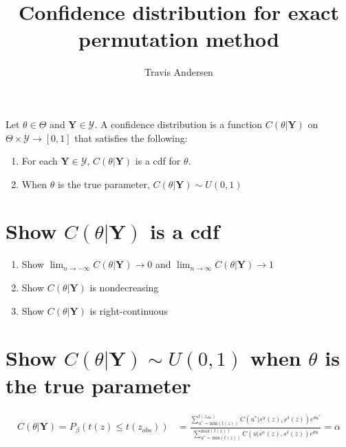 \documentclass{article}
\title{Confidence distribution for exact permutation method}
\author{Travis Andersen}
\begin{document}
\maketitle  

Let $\theta \in \Theta$ and $\textbf{Y} \in \mathcal{Y}$. A confidence distribution is a function $C(\theta|\textbf{Y})$ on $\Theta \times \mathcal{Y} \to [0, 1]$ that satisfies the following:

\begin{enumerate}
  \item For each $\textbf{Y} \in \mathcal{Y}$, $C(\theta|\textbf{Y})$ is a cdf for $\theta$. 
  \item When $\theta$ is the true parameter, $C(\theta|\textbf{Y}) \sim U(0, 1)$
\end{enumerate}

\section{Show $C(\theta|\textbf{Y})$ is a cdf}
\begin{enumerate}
  \item Show $\lim_{n \to -\infty} C(\theta|\textbf{Y}) \to 0$ and $\lim_{n \to \infty} C(\theta|\textbf{Y}) \to 1$
  \item Show $C(\theta|\textbf{Y})$ is nondecreasing
  \item Show $C(\theta|\textbf{Y})$ is right-continuous
\end{enumerate}

\section{Show $C(\theta|\textbf{Y}) \sim U(0, 1)$ when $\theta$ is the true parameter}

\begin{align*}
  C(\theta|\textbf{Y}) = P_\beta(t(z) \leq t(z_{obs})) &= \frac{\sum_{u^*=\text{min}(t(z))}^{t(z_{obs})} C(u^*|s^\alpha(z), s^\delta(z))e^{\theta u^*}}{\sum_{u^*=\text{min}(t(z))}^{\text{max}(t(z))} C(u|s^\alpha(z), s^\delta(z))e^{\theta u}} = \alpha \\
\end{align*}
\end{document}
